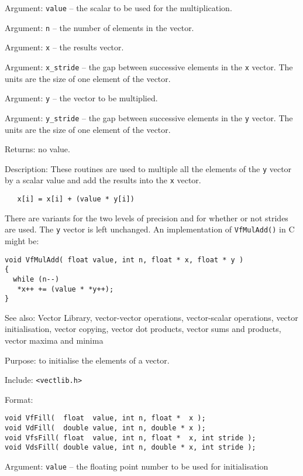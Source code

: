 Argument: {\tt value} -- the scalar to be used for the multiplication.

Argument: {\tt n} -- the number of elements in the vector.

Argument: {\tt x} -- the results vector.

Argument: \verb+x_stride+ -- the gap between successive elements in the
{\tt x} vector.  The units are the size of one element of the vector.

Argument: {\tt y} -- the vector to be multiplied.

Argument: \verb+y_stride+ -- the gap between successive elements in the
{\tt y} vector.  The units are the size of one element of the vector.

Returns: no value.

Description: These routines are used to multiple all the elements of
the {\tt y} vector by a scalar value and add the results into the
{\tt x} vector.

\begin{verbatim}
   x[i] = x[i] + (value * y[i])
\end{verbatim}

There are variants for the two levels of precision and for whether
or not strides are used. The {\tt y} vector is left unchanged.
An implementation of {\tt VfMulAdd()} in C might be:

\begin{verbatim}
void VfMulAdd( float value, int n, float * x, float * y )
{
  while (n--)
   *x++ += (value * *y++);
}
\end{verbatim}

See also: Vector Library, vector-vector operations, vector-scalar operations,
vector initialisation, vector copying, vector dot products, vector sums and
products, vector maxima and minima

Purpose: to initialise the elements of a vector.

Include: \verb+<vectlib.h>+

Format:

\begin{verbatim}
void VfFill(  float  value, int n, float *  x );
void VdFill(  double value, int n, double * x );
void VfsFill( float  value, int n, float *  x, int stride );
void VdsFill( double value, int n, double * x, int stride );
\end{verbatim}

Argument: {\tt value} -- the floating point number to be used for initialisation

